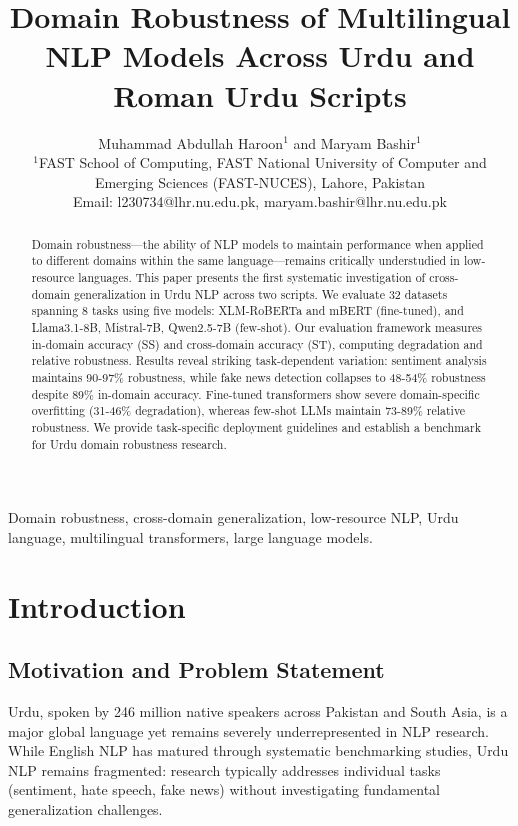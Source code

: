 \documentclass[10pt,twocolumn,journal]{IEEEtran}
\title{Domain Robustness of Multilingual NLP Models Across Urdu and Roman Urdu Scripts}
\author{Muhammad Abdullah Haroon$^{1}$ and Maryam Bashir$^{1}$\\
$^{1}$FAST School of Computing, FAST National University of Computer and Emerging Sciences (FAST-NUCES), Lahore, Pakistan\\
Email: l230734@lhr.nu.edu.pk, maryam.bashir@lhr.nu.edu.pk}
\begin{document}
\maketitle

\begin{abstract}
Domain robustness---the ability of NLP models to maintain performance when applied to different domains within the same language---remains critically understudied in low-resource languages. This paper presents the first systematic investigation of cross-domain generalization in Urdu NLP across two scripts. We evaluate 32 datasets spanning 8 tasks using five models: XLM-RoBERTa and mBERT (fine-tuned), and Llama3.1-8B, Mistral-7B, Qwen2.5-7B (few-shot). Our evaluation framework measures in-domain accuracy (SS) and cross-domain accuracy (ST), computing degradation and relative robustness. Results reveal striking task-dependent variation: sentiment analysis maintains 90-97\% robustness, while fake news detection collapses to 48-54\% robustness despite 89\% in-domain accuracy. Fine-tuned transformers show severe domain-specific overfitting (31-46\% degradation), whereas few-shot LLMs maintain 73-89\% relative robustness. We provide task-specific deployment guidelines and establish a benchmark for Urdu domain robustness research.
\end{abstract}

\begin{IEEEkeywords}
Domain robustness, cross-domain generalization, low-resource NLP, Urdu language, multilingual transformers, large language models.
\end{IEEEkeywords}

\section{Introduction}

\subsection{Motivation and Problem Statement}

Urdu, spoken by 246 million native speakers across Pakistan and South Asia, is a major global language yet remains severely underrepresented in NLP research. While English NLP has matured through systematic benchmarking studies, Urdu NLP remains fragmented: research typically addresses individual tasks (sentiment, hate speech, fake news) without investigating fundamental generalization challenges.
\end{document}
